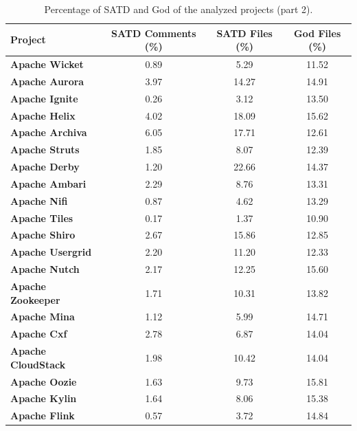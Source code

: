 \begin{landscape}
	
	
	
	\begin{table}[htbp]
		\small
		\centering
		\caption{Percentage of SATD and God of the analyzed projects  (part 2).}
		\begin{adjustbox}{width=1.0\textwidth}
			
			
			\begin{tabular}{l|c|c|c}
				\hline
				\textbf{Project}  & \textbf{SATD Comments (\%)}  & \textbf{SATD Files (\%)} & \textbf{God Files (\%)} \\ \hline
				\textbf{Apache Wicket} &  0.89 & 5.29 & 11.52    \\ \hline
				\textbf{Apache Aurora} &  3.97 & 14.27 & 14.91    \\ \hline
				\textbf{Apache Ignite} &  0.26 & 3.12 & 13.50   \\ \hline
				\textbf{Apache Helix} &  4.02 & 18.09 & 15.62    \\ \hline
				\textbf{Apache Archiva} &  6.05 & 17.71 & 12.61    \\ \hline
				\textbf{Apache Struts} &  1.85 & 8.07 & 12.39    \\ \hline
				\textbf{Apache Derby} &  1.20 & 22.66 & 14.37    \\ \hline
				\textbf{Apache Ambari} &  2.29 & 8.76 & 13.31   \\ \hline
				\textbf{Apache Nifi} &  0.87 & 4.62 & 13.29    \\ \hline
				\textbf{Apache Tiles} &  0.17 & 1.37 & 10.90    \\ \hline
				\textbf{Apache Shiro} &  2.67 & 15.86 & 12.85    \\ \hline
				\textbf{Apache Usergrid} &  2.20 & 11.20 & 12.33    \\ \hline
				\textbf{Apache Nutch} &  2.17 & 12.25 & 15.60    \\ \hline
				\textbf{Apache Zookeeper} &  1.71 & 10.31 & 13.82   \\ \hline
				\textbf{Apache Mina} &  1.12 & 5.99 & 14.71   \\ \hline
				\textbf{Apache Cxf} &  2.78 & 6.87 & 14.04   \\ \hline
				\textbf{Apache CloudStack} &  1.98 & 10.42 & 14.04   \\ \hline
				\textbf{Apache Oozie} &  1.63 & 9.73 & 15.81   \\ \hline
				\textbf{Apache Kylin} &  1.64 & 8.06 & 15.38   \\ \hline
				\textbf{Apache Flink} &  0.57 & 3.72 & 14.84   \\ \hline
				
			\end{tabular}
			\label{table:projects_satd_god_percentage2}
			
		\end{adjustbox}
		
	\end{table}
	
\end{landscape}


